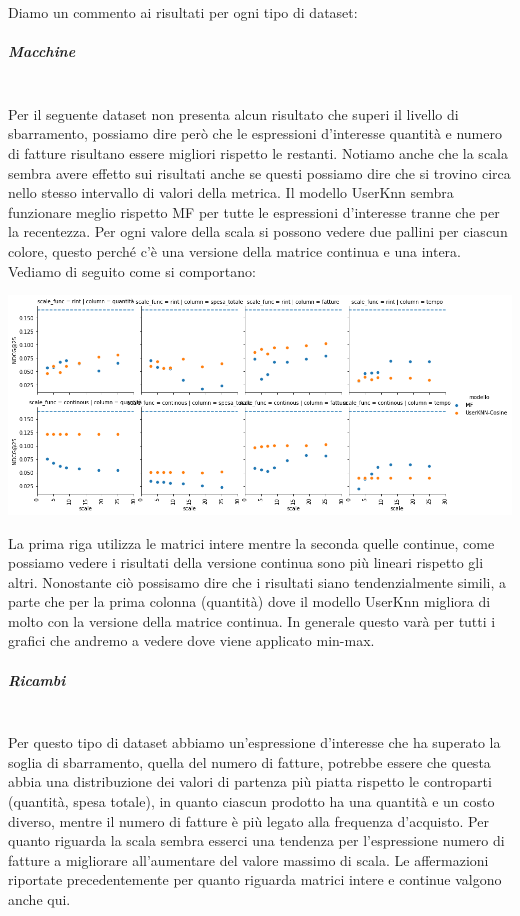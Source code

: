 Diamo un commento ai risultati per ogni tipo di dataset:\\
\subparagraph{Macchine}\mbox{} \\

Per il seguente dataset non presenta alcun risultato che superi il livello di sbarramento, possiamo dire però che le espressioni d'interesse quantità e numero di fatture risultano essere migliori rispetto le restanti. Notiamo anche che la scala sembra avere effetto sui risultati anche se questi possiamo dire che si trovino circa nello stesso intervallo di valori della metrica. Il modello UserKnn sembra funzionare meglio rispetto MF per tutte le espressioni d'interesse tranne che per la recentezza. Per ogni valore della scala si possono vedere due pallini per ciascun colore, questo perché c'è una versione della matrice continua e una intera. Vediamo di seguito come si comportano:

\includegraphics[width=16cm]{figures/scale_func_minmax_glob_macchine.png}

La prima riga utilizza le matrici intere mentre la seconda quelle continue, come possiamo vedere i risultati della versione continua sono più lineari rispetto gli altri. Nonostante ciò possisamo dire che i risultati siano tendenzialmente simili, a parte che per la prima colonna (quantità) dove il modello UserKnn migliora di molto con la versione della matrice continua. In generale questo varà per tutti i grafici che andremo a vedere dove viene applicato min-max.

\subparagraph{Ricambi}\mbox{} \\
Per questo tipo di dataset abbiamo un'espressione d'interesse che ha superato la soglia di sbarramento, quella del numero di fatture, potrebbe essere che questa abbia una distribuzione dei valori di partenza più piatta rispetto le controparti (quantità, spesa totale), in quanto ciascun prodotto ha una quantità e un costo diverso, mentre il numero di fatture è più legato alla frequenza d'acquisto.
Per quanto riguarda la scala sembra esserci una tendenza per l'espressione numero di fatture a migliorare all'aumentare del valore massimo di scala.
Le affermazioni riportate precedentemente per quanto riguarda matrici intere e continue valgono anche qui.

